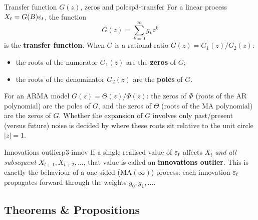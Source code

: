 \begin{definition}{Transfer function $G(z)$, zeros and poles}{p3-transfer}
For a linear process $X_t=G(B)\varepsilon_t$, the function
\[
G(z)=\sum_{k=0}^{\infty}g_k z^{k}
\]
is the \textbf{transfer function}. When $G$ is a rational ratio
$G(z)=G_1(z)/G_2(z)$:
\begin{itemize}
  \item the roots of the numerator $G_1(z)$ are the \textbf{zeros} of $G$;
  \item the roots of the denominator $G_2(z)$ are the \textbf{poles} of $G$.
\end{itemize}
For an $\mathrm{ARMA}$ model $G(z)=\Theta(z)/\Phi(z)$: the zeros of $\Phi$
(roots of the AR polynomial) are the poles of $G$, and the zeros of $\Theta$
(roots of the MA polynomial) are the zeros of $G$. Whether the expansion of
$G$ involves only past/present (versus future) noise is decided by where these
roots sit relative to the unit circle $|z|=1$.
\end{definition}

\begin{definition}{Innovations outlier}{p3-innov}
If a single realised value of $\varepsilon_t$ affects $X_t$ \emph{and all subsequent}
$X_{t+1},X_{t+2},\dots$, that value is called an \textbf{innovations outlier}.
This is exactly the behaviour of a one-sided ($\mathrm{MA}(\infty)$) process:
each innovation $\varepsilon_t$ propagates forward through the weights $g_0,g_1,\dots$.
\end{definition}

\subsection{Theorems \& Propositions}

